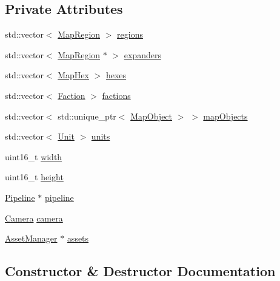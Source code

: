 \subsection*{Private Attributes}
\begin{DoxyCompactItemize}
\item 
std\+::vector$<$ \hyperlink{class_map_region}{Map\+Region} $>$ \hyperlink{class_game_map_a8210c97d906cc6ab2d9f98915504ea6a}{regions}
\item 
std\+::vector$<$ \hyperlink{class_map_region}{Map\+Region} $\ast$ $>$ \hyperlink{class_game_map_a23fc8cbef7e92535488681204927b5a1}{expanders}
\item 
std\+::vector$<$ \hyperlink{class_map_hex}{Map\+Hex} $>$ \hyperlink{class_game_map_a1d7742388e866521392b4c6747303c8b}{hexes}
\item 
std\+::vector$<$ \hyperlink{class_faction}{Faction} $>$ \hyperlink{class_game_map_a1f956a9bdb41dcb655696af973f30a89}{factions}
\item 
std\+::vector$<$ std\+::unique\+\_\+ptr$<$ \hyperlink{class_map_object}{Map\+Object} $>$ $>$ \hyperlink{class_game_map_ad6eead6daa7b8442ac5129750f1eecd1}{map\+Objects}
\item 
std\+::vector$<$ \hyperlink{class_unit}{Unit} $>$ \hyperlink{class_game_map_a3620b68d7f24cfb57e3083acdf534ff6}{units}
\item 
uint16\+\_\+t \hyperlink{class_game_map_a827aedef06be5c3115eeea3ac8e68b72}{width}
\item 
uint16\+\_\+t \hyperlink{class_game_map_a37c9c83ab73f37508753f45cbc9594d5}{height}
\item 
\hyperlink{class_pipeline}{Pipeline} $\ast$ \hyperlink{class_game_map_a0fd10cff6ef3c8b1b96eb7f3cabc8946}{pipeline}
\item 
\hyperlink{class_camera}{Camera} \hyperlink{class_game_map_a5004693ddf0a979bd379fc1a32f5ab8f}{camera}
\item 
\hyperlink{class_asset_manager}{Asset\+Manager} $\ast$ \hyperlink{class_game_map_af63a6638804af038977a55f6e4d6d6bd}{assets}
\end{DoxyCompactItemize}


\subsection{Constructor \& Destructor Documentation}
\mbox{\label{class_game_map_aae71e5694cf19612fcaa4c1e21b03b71}} 
